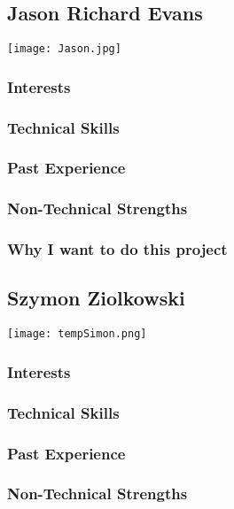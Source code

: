 
\subsection{Jason Richard Evans}
\texttt{[image: Jason.jpg]}

\subsubsection{Interests}
\subsubsection{Technical Skills}
\subsubsection{Past Experience}
\subsubsection{Non-Technical Strengths}
\subsubsection{Why I want to do this project}

\subsection{Szymon Ziolkowski}
\texttt{[image: tempSimon.png]}

\subsubsection{Interests}
\subsubsection{Technical Skills}
\subsubsection{Past Experience}
\subsubsection{Non-Technical Strengths}
